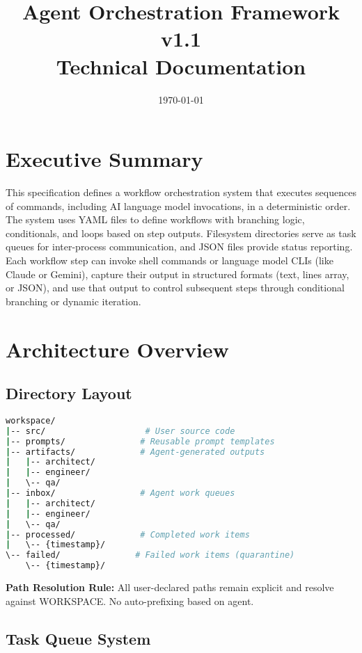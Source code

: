 \documentclass[11pt,a4paper]{article}
\title{\Huge\textbf{Agent Orchestration Framework v1.1}\\[0.5cm]
       \Large Technical Documentation}
\author{}
\date{\today}
\begin{document}
\maketitle
\thispagestyle{empty}

\newpage
\tableofcontents
\newpage

\section{Executive Summary}

This specification defines a workflow orchestration system that executes sequences of commands, including AI language model invocations, in a deterministic order. The system uses YAML files to define workflows with branching logic, conditionals, and loops based on step outputs. Filesystem directories serve as task queues for inter-process communication, and JSON files provide status reporting. Each workflow step can invoke shell commands or language model CLIs (like Claude or Gemini), capture their output in structured formats (text, lines array, or JSON), and use that output to control subsequent steps through conditional branching or dynamic iteration.

\section{Architecture Overview}

\subsection{Directory Layout}

\begin{lstlisting}[language=bash, caption={Workspace Directory Structure}]
workspace/
|-- src/                    # User source code
|-- prompts/               # Reusable prompt templates
|-- artifacts/             # Agent-generated outputs
|   |-- architect/
|   |-- engineer/
|   \-- qa/
|-- inbox/                 # Agent work queues
|   |-- architect/
|   |-- engineer/
|   \-- qa/
|-- processed/             # Completed work items
|   \-- {timestamp}/
\-- failed/               # Failed work items (quarantine)
    \-- {timestamp}/
\end{lstlisting}

\textbf{Path Resolution Rule:} All user-declared paths remain explicit and resolve against WORKSPACE. No auto-prefixing based on agent.

\subsection{Task Queue System}
\end{document}
